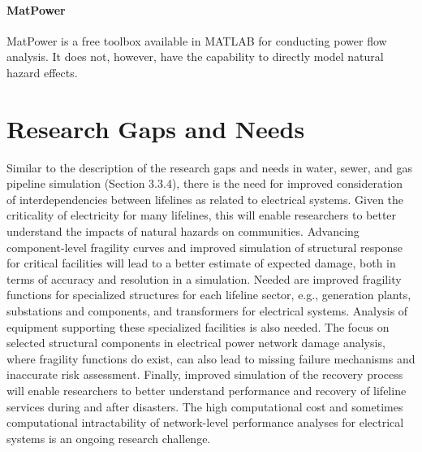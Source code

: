 \paragraph{MatPower} MatPower is a free toolbox available in MATLAB for conducting power flow analysis. It does not, however, have the capability to directly model natural hazard effects.

\section{Research Gaps and Needs}
\label{sec:perf_power_gaps}

Similar to the description of the research gaps and needs in water, sewer, and gas pipeline simulation (Section 3.3.4), there is the need for improved consideration of interdependencies between lifelines as related to electrical systems. Given the criticality of electricity for many lifelines, this will enable researchers to better understand the impacts of natural hazards on communities. Advancing component-level fragility curves and improved simulation of structural response for critical facilities will lead to a better estimate of expected damage, both in terms of accuracy and resolution in a simulation. Needed are improved fragility functions for specialized structures for each lifeline sector, e.g., generation plants, substations and components, and transformers for electrical systems. Analysis of equipment supporting these specialized facilities is also needed. The focus on selected structural components in electrical power network damage analysis, where fragility functions do exist, can also lead to missing failure mechanisms and inaccurate risk assessment. Finally, improved simulation of the recovery process will enable researchers to better understand performance and recovery of lifeline services during and after disasters. The high computational cost and sometimes computational intractability of network-level performance analyses for electrical systems is an ongoing research challenge.

